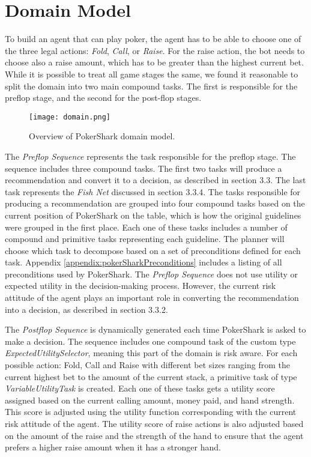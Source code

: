 \section{Domain Model}
To build an agent that can play poker, the agent has to be able to choose one of the three legal actions: \textit{Fold}, \textit{Call}, or \textit{Raise}. For the raise action, the bot needs to choose also a raise amount, which has to be greater than the highest current bet.
While it is possible to treat all game stages the same, we found it reasonable to split the domain into two main compound tasks. The first is responsible for the preflop stage, and the second for the post-flop stages.

\begin{figure}[h]
    \centering
    \texttt{[image: domain.png]}
    \caption{Overview of PokerShark domain model.}
    \label{fig:model}
\end{figure}

The \textit{Preflop Sequence} represents the task responsible for the preflop stage. The sequence includes three compound tasks. The first two tasks will produce a recommendation and convert it to a decision, as described in section 3.3. The last task represents the \textit{Fish Net} discussed in section 3.3.4. The tasks responsible for producing a recommendation are grouped into four compound tasks based on the current position of PokerShark on the table, which is how the original guidelines were grouped in the first place. Each one of these tasks includes a number of compound and primitive tasks representing each guideline. The planner will choose which task to decompose based on a set of preconditions defined for each task. Appendix \ref{appendix:pokerSharkPreconditions} includes a listing of all preconditions used by PokerShark. The \textit{Preflop Sequence} does not use utility or expected utility in the decision-making process. However, the current risk attitude of the agent plays an important role in converting the recommendation into a decision, as described in section 3.3.2.

The \textit{Postflop Sequence} is dynamically generated each time PokerShark is asked to make a decision. The sequence includes one compound task of the custom type \textit{ExpectedUtilitySelector}, meaning this part of the domain is risk aware. For each possible action: Fold, Call and Raise with different bet sizes ranging from the current highest bet to the amount of the current stack, a primitive task of type \textit{VariableUtilityTask} is created. Each one of these tasks gets a utility score assigned based on the current calling amount, money paid, and hand strength. This score is adjusted using the utility function corresponding with the current risk attitude of the agent. The utility score of raise actions is also adjusted based on the amount of the raise and the strength of the hand to ensure that the agent prefers a higher raise amount when it has a stronger hand.

